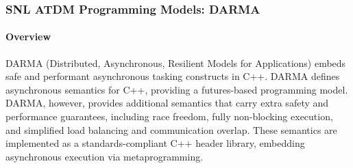 
\subsubsection{ SNL ATDM Programming Models: DARMA} 

\paragraph{Overview} 
DARMA (Distributed, Asynchronous, Resilient Models for Applications) embeds safe and performant asynchronous tasking constructs in C++.
DARMA defines asynchronous semantics for C++, providing a futures-based programming model. 
DARMA, however, provides additional semantics that carry extra safety and performance guarantees,
including race freedom, fully non-blocking execution, and simplified load balancing and communication overlap.
These semantics are implemented as a standards-compliant C++ header library,
embedding asynchronous execution via metaprogramming.

